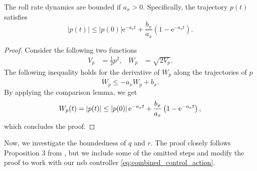 \begin{proposition}\label{proposition:roll_rate}
The roll rate dynamics are bounded if $a_x > 0$.
Specifically, the trajectory $p(t)$ satisfies
\begin{equation}
    |p(t)| \leq |p(0)|\mathrm{e}^{-a_x t} + \frac{b_x}{a_x}\left(1 - \mathrm{e}^{-a_x t}\right).
\end{equation}
\end{proposition}
\begin{proof}  Consider the following two functions
        \begin{align}
            V_{p} &= \frac{1}{2} p^2, &
            W_{p} &= \sqrt{2 V_{p}}.
        \end{align}
        The following inequality holds for the derivative of $W_p$ along the trajectories of $p$
        \begin{equation}
            \dot{W}_p \leq -a_xW_p + b_x.
        \end{equation}
        By applying the comparison lemma, we get
        \begin{equation}
            W_p(t) = \left|p(t)\right| \leq \left|p(0)\right|{\rm e}^{-a_xt} + \frac{b_x}{a_x}\left(1 - {\rm e}^{-a_xt}\right),
        \end{equation}
        which concludes the proof.
\end{proof}

Now, we investigate the boundedness of $q$ and $r$. The proof closely follows Proposition 3 from \cite{matous_trajectory_2023}, but we include some of the omitted steps and modify the proof to work with our \gls{nsb} controller \eqref{eq:combined_control_action}.

